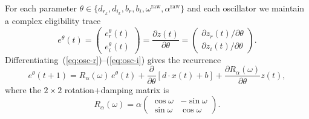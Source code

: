 \documentclass[11pt]{article}
\newcommand{\zr}{z_r}
\newcommand{\zi}{z_i}
\newcommand{\dr}{d_r}
\newcommand{\di}{d_i}
\newcommand{\br}{b_r}
\newcommand{\bi}{b_i}
\begin{document}
For each parameter $\theta \in \{\dr_k, \di_k, \br, \bi, \omega^{\mathrm{raw}}, \alpha^{\mathrm{raw}}\}$ and each oscillator we maintain a complex eligibility trace
\begin{equation}
e^\theta(t) = \begin{pmatrix} e^\theta_r(t) \\ e^\theta_i(t) \end{pmatrix}
            = \frac{\partial z(t)}{\partial \theta} =
            \begin{pmatrix} \partial \zr(t)/\partial \theta \\
                            \partial \zi(t)/\partial \theta \end{pmatrix}.
\end{equation}
Differentiating~(\ref{eq:osc-r})--(\ref{eq:osc-i}) gives the recurrence
\begin{equation}
e^\theta(t+1) = R_\alpha(\omega) \, e^\theta(t)
              + \frac{\partial}{\partial \theta}\!\left[d \cdot x(t) + b\right]
              + \frac{\partial R_\alpha(\omega)}{\partial \theta} z(t),
\label{eq:elig-recur}
\end{equation}
where the $2\times 2$ rotation+damping matrix is
\begin{equation}
R_\alpha(\omega) = \alpha \begin{pmatrix} \cos\omega & -\sin\omega \\ \sin\omega & \cos\omega \end{pmatrix}.
\end{equation}
\end{document}
